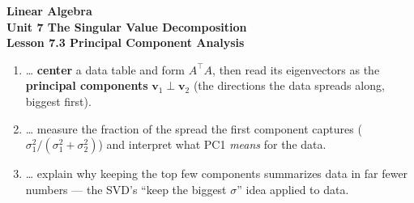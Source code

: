 \documentclass[10pt]{article}
\begin{document}
\vspace{-0.8in}

\begin{center}
  {\color{white}\textbf{\LARGE Linear Algebra}}\\[4pt]
  {\color{blushmid}\large\textbf{Unit 7 \quad The Singular Value Decomposition}}\\[6pt]
  {\color{white}\textbf{\large Lesson 7.3 \quad Principal Component Analysis}}
\end{center}

\vspace{0.22in}
\namedateperiod
\vspace{0.18in}

\begin{learningtargetbox}
\small
\begin{enumerate}[leftmargin=1.5em, itemsep=5pt]
  \item \ldots{} \textbf{center} a data table and form $A^{\top}A$, then read its eigenvectors as the \textbf{principal components} $\mathbf{v}_1\perp\mathbf{v}_2$ (the directions the data spreads along, biggest first).
  \item \ldots{} measure the fraction of the spread the first component captures ($\sigma_1^2/(\sigma_1^2+\sigma_2^2)$) and interpret what PC1 \emph{means} for the data.
  \item \ldots{} explain why keeping the top few components summarizes data in far fewer numbers --- the SVD's ``keep the biggest $\sigma$'' idea applied to data.
\end{enumerate}
\end{learningtargetbox}

\vspace{0.14in}
\end{document}
